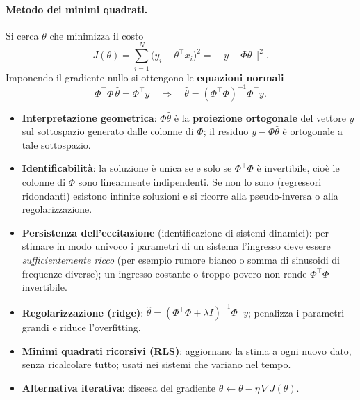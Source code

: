 \paragraph{Metodo dei minimi quadrati.} Si cerca $\theta$ che minimizza il costo
\[
J(\theta) = \sum_{i=1}^{N} \bigl(y_i - \theta^\top x_i\bigr)^2 = \lVert y - \Phi\theta\rVert^2 .
\]
Imponendo il gradiente nullo si ottengono le \textbf{equazioni normali}
\[
\Phi^\top\Phi\,\hat\theta = \Phi^\top y
\quad\Longrightarrow\quad
\hat\theta = (\Phi^\top\Phi)^{-1}\Phi^\top y .
\]
\begin{itemize}
    \item \textbf{Interpretazione geometrica}: $\Phi\hat\theta$ è la \textbf{proiezione ortogonale} del vettore $y$ sul sottospazio generato dalle colonne di $\Phi$; il residuo $y-\Phi\hat\theta$ è ortogonale a tale sottospazio.
    \item \textbf{Identificabilità}: la soluzione è unica se e solo se $\Phi^\top\Phi$ è invertibile, cioè le colonne di $\Phi$ sono linearmente indipendenti. Se non lo sono (regressori ridondanti) esistono infinite soluzioni e si ricorre alla pseudo-inversa o alla regolarizzazione.
    \item \textbf{Persistenza dell'eccitazione} (identificazione di sistemi dinamici): per stimare in modo univoco i parametri di un sistema l'ingresso deve essere \emph{sufficientemente ricco} (per esempio rumore bianco o somma di sinusoidi di frequenze diverse); un ingresso costante o troppo povero non rende $\Phi^\top\Phi$ invertibile.
    \item \textbf{Regolarizzazione (ridge)}: $\hat\theta = (\Phi^\top\Phi + \lambda I)^{-1}\Phi^\top y$; penalizza i parametri grandi e riduce l'overfitting.
    \item \textbf{Minimi quadrati ricorsivi (RLS)}: aggiornano la stima a ogni nuovo dato, senza ricalcolare tutto; usati nei sistemi che variano nel tempo.
    \item \textbf{Alternativa iterativa}: discesa del gradiente $\theta \leftarrow \theta - \eta\,\nabla J(\theta)$.
\end{itemize}

